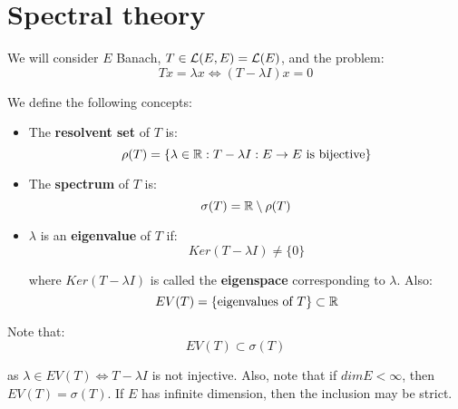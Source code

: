 \chapter{Spectral theory}

\begin{note}
    We will consider $E$ Banach, $T \in \mathcal{L}(E, E) = \mathcal{L}(E)$, and the problem:
    $$Tx = \lambda x \iff (T - \lambda I)x = 0$$
\end{note}

\begin{fdefinition}
    We define the following concepts:
    \vspace{1em}
    \begin{itemize}
        \item The \textbf{resolvent set} of $T$ is:
        $$\rho(T) = \{ \lambda \in \mathbb{R}: T - \lambda I: E \to E \text{ is bijective} \}$$

        \vspace{1em}
        \item The \textbf{spectrum} of $T$ is:
        $$\sigma(T) = \mathbb{R} \setminus \rho(T)$$

        \vspace{1em}
        \item $\lambda$ is an \textbf{eigenvalue} of $T$ if:
        $$Ker(T - \lambda I) \neq \{0\}$$

        where $Ker (T - \lambda I)$ is called the \textbf{eigenspace} corresponding to $\lambda$.
        Also:
        $$EV(T) = \{\text{eigenvalues of } T\} \subset \mathbb{R}$$
    \end{itemize}
\end{fdefinition}

\begin{fremark}
    Note that:
    $$EV(T) \subset \sigma(T)$$

    as $\lambda \in EV(T) \iff T - \lambda I$ is not injective. Also, note that if $dim E < \infty$, 
    then $EV(T) = \sigma(T)$. If $E$ has infinite dimension, then the inclusion may be strict.
\end{fremark}

